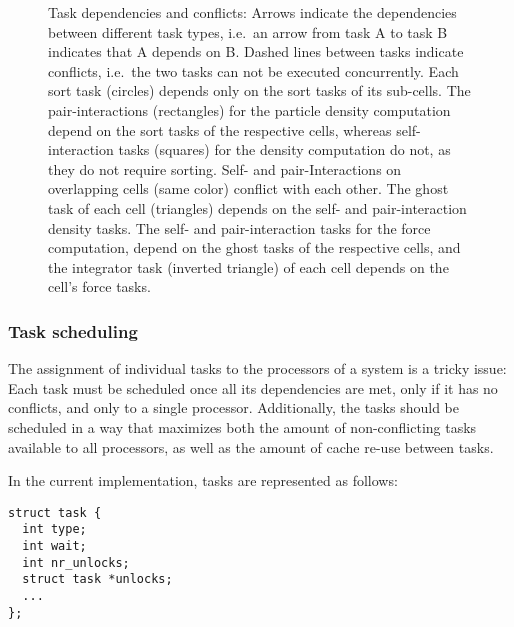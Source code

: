 \documentclass[final]{siamltex}
\begin{document}
\begin{figure}
    \centerline{}
    
    \caption{Task dependencies and conflicts:
        Arrows indicate the dependencies
        between different task types, i.e.~an arrow from task A to task
        B indicates that A depends on B.
        Dashed lines between tasks indicate conflicts, i.e.~the two tasks
        can not be executed concurrently.
        Each sort task (circles) depends
        only on the sort tasks of its sub-cells.
        The pair-interactions (rectangles) for the particle
        density computation depend on the sort tasks of the respective cells,
        whereas self-interaction tasks (squares) for the density computation
        do not, as they do not require sorting.
        Self- and pair-Interactions on overlapping cells (same color)
        conflict with each other.
        The ghost task of each cell (triangles) depends on the self-
        and pair-interaction density tasks.
        The self- and pair-interaction tasks for the force computation,
        depend on the ghost tasks of the respective cells,
        and the integrator task (inverted triangle) of each cell depends on the cell's
        force tasks.
        }
    \label{fig:Hierarchy2}
\end{figure}


\subsubsection{Task scheduling}

The assignment of individual tasks to the processors of a system
is a tricky issue:
Each task must be scheduled once all its dependencies are met,
only if it has no conflicts, and only to a single processor.
Additionally, the tasks should be scheduled in a way that
maximizes both the amount of non-conflicting tasks available to all
processors, as well as the amount of cache re-use between tasks.

In the current implementation, tasks are represented as follows:
        
\begin{center}\begin{minipage}{0.8\textwidth}
    \begin{lstlisting}
struct task {
  int type;
  int wait;
  int nr_unlocks;
  struct task *unlocks;
  ...
};
    \end{lstlisting}
\end{minipage}\end{center}
\end{document}
